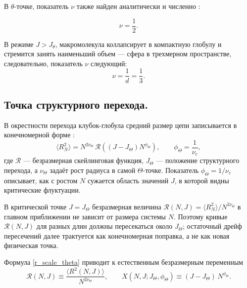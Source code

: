  
В  ${\theta}$-точке, показатель $\nu$ также найден аналитически  \cite{Vanderzande_1998} и численно  \cite{barat1993series}: 

\begin{equation}
	\label{eq:nu_3D_Jtheta_flory}
	\nu = \frac{1}{2}.
\end{equation} 


В режиме $J > J_{\theta}$,  макромолекула  коллапсирует в компактную глобулу  и стремится занять наименьший  объем --- сфера в трехмерном пространстве, следовательно, показатель $\nu$  следующий:  
\begin{equation}
	\label{eq:nu_3D_Jglobular_flory}
	\nu = \frac{1}{d} = \frac{1}{3}.
\end{equation}



\subsection{Точка структурного перехода.}

В окрестности перехода клубок-глобула средний размер цепи записывается в конечномерной форме \cite{Scaling_concepts}:
\begin{equation}
	\label{r_scale_theta}
	\langle R_N^2\rangle
=
N^{2\nu_\Theta}\,
\mathcal{R}\!\left((J-J_\Theta)N^{\phi_\Theta}\right),
\qquad
\phi_\Theta=\frac{1}{\nu_c}, 
\end{equation} 
где $\mathcal{R}$ --- безразмерная скейлинговая функция, $J_{\Theta}$ --- положение структурного перехода, а $\nu_\Theta$ задаёт рост радиуса в самой $\Theta$-точке. 
Показатель $\phi_\Theta=1/\nu_c$ описывает, как с ростом $N$ сужается область значений $J$, в которой видны критические флуктуации.

 В критической точке $J = J_{\Theta} $ безразмерная величина 
 $  \mathcal{R} (N, J)= 	\langle R_N^2 \rangle / N ^ {2 \nu _ {\Theta}} $  в главном приближении не зависит от размера системы $N$. 
 Поэтому кривые $  \mathcal{R} (N, J)  $ для разных длин должны пересекаться около $J_\Theta$; остаточный дрейф пересечений далее трактуется как конечномерная поправка, а не как новая физическая точка.
 
 
 Формула \eqref{r_scale_theta} приводит к естественным безразмерным переменным \cite{Scaling_concepts}
 \begin{equation}
   \mathcal{R}(N, J)  \equiv \frac{ \langle  R^2(N,J) \rangle }{N^{2\nu_\Theta}}   ,
 	\qquad
 	X(N,J;J_\Theta,\phi_\Theta) \equiv (J-J_\Theta)\,N^{\phi_\Theta}.
 	\label{eq:XY_defs}
 \end{equation} 
 

